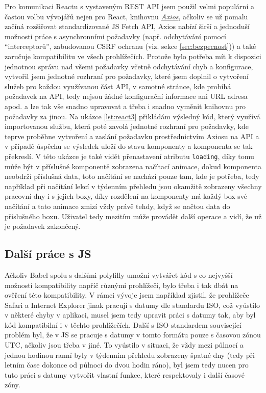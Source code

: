     Pro komunikaci Reactu s vystaveným REST API jsem použil velmi populární a častou volbu vývojářů nejen pro React, knihovnu \href{https://github.com/axios/axios}{\textit{Axios}}, ačkoliv se už pomalu začíná rozšiřovat standardizované JS Fetch API, Axios nabízí širší a jednoduší možnosti práce s asynchronními požadavky (např. odchytávání pomocí \enquote{interceptorů}, zabudovanou CSRF ochranu (viz. sekce \ref{sec:bezpecnost})) a také zaručuje kompatibilitu ve všech prohlížečích. Protože bylo potřeba mít k dispozici jednotnou správu nad všemi požadavky včetně odchytávání chyb a konfigurace, vytvořil jsem jednotné rozhraní pro požadavky, které jsem doplnil o vytvoření služeb pro každou využívanou část API, v samotné stránce, kde probíhá požadavek na API, tedy nejsou žádné konfigurační informace ani URL adresa apod. a lze tak vše snadno upravovat a třeba i snadno vyměnit knihovnu pro požadavky za jinou. Na ukázce \ref{lst:react3} přikládám výsledný kód, který využívá importovanou službu, která poté zavolá jednotné rozhraní pro požadavky, kde teprve proběhne vytvoření a zaslání požadavku prostřednictvím Axiosu na API a v případě úspěchu se výsledek uloží do stavu komponenty a komponenta se tak překreslí. V této ukázce je také vidět přenastavení atributu \verb|loading|, díky tomu může být v příslušné komponentě zobrazena načítací animace, dokud komponenta neobdrží příslušná data, toto načítání se nachází pouze tam, kde je potřeba, tedy například při načítání lekcí v týdenním přehledu jsou okamžitě zobrazeny všechny pracovní dny i s jejich boxy, díky rozdělení na komponenty má každý box své načítání a tato animace zmizí vždy právě tehdy, když se načtou data do příslušného boxu. Uživatel tedy mezitím může provádět další operace a vidí, že už je požadavek zakončený.
    
    \subsection{Další práce s JS}
    Ačkoliv Babel spolu s dalšími polyfilly umožní vytvářet kód s co nejvyšší možností kompatibility napříč různými prohlížeči, bylo třeba i tak dbát na ověření této kompatibility. V rámci vývoje jsem například zjistil, že prohlížeče Safari a Internet Explorer jinak pracují s datumy dle standardu ISO, což vyústilo v některé chyby v aplikaci, musel jsem tedy upravit práci s datumy tak, aby byl kód kompatibilní i v těchto prohlížečích. Další s ISO standardem související problém byl, že v JS se pracuje s datumy v tomto formátu pouze s časovou zónou UTC, ačkoliv jsou třeba v jiné. To vyústilo v situaci, že vždy mezi půlnocí a jednou hodinou ranní byly v týdenním přehledu zobrazeny špatné dny (tedy při letním čase dokonce od půlnoci do dvou hodin ráno), byl jsem tedy nucen pro tuto práci s datumy vytvořit vlastní funkce, které respektovaly i další časové zóny.
    

